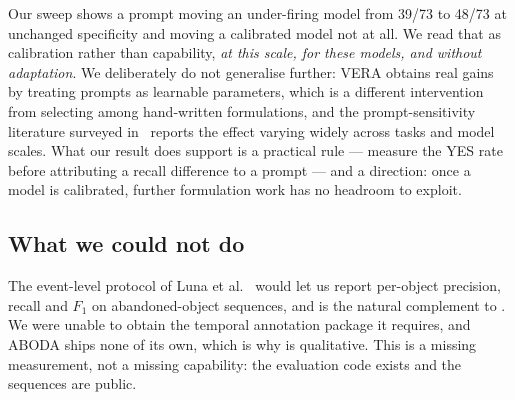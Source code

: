 Our sweep shows a prompt moving an under-firing model from 39/73 to 48/73 at
unchanged specificity and moving a calibrated model not at all. We read that as
calibration rather than capability, \emph{at this scale, for these models, and
without adaptation}. We deliberately do not generalise further: VERA
\cite{Ye_2025} obtains real gains by treating prompts as learnable parameters,
which is a different intervention from selecting among hand-written
formulations, and the prompt-sensitivity literature surveyed
in~\cite{Ren_2025} reports the effect varying widely across tasks and model
scales. What our result does support is a practical rule --- measure the YES
rate before attributing a recall difference to a prompt --- and a direction:
once a model is calibrated, further formulation work has no headroom to
exploit.

\subsection{What we could not do}

The event-level protocol of Luna et al.~\cite{Luna_2018} would let us report
per-object precision, recall and $F_1$ on abandoned-object sequences, and is
the natural complement to . We were unable to obtain
the temporal annotation package it requires, and ABODA ships none of its own,
which is why  is qualitative. This is a missing
measurement, not a missing capability: the evaluation code exists and the
sequences are public.
